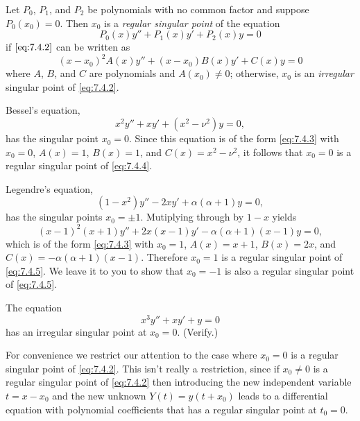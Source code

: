 \documentclass{ximera}
\begin{document}
\begin{definition}\label{thmtype:7.4.1}
Let $P_0$, $P_1$, and $P_2$ be polynomials with no common factor and
suppose  $P_0(x_0)=0$. Then $x_0$ is a \textit{regular singular
point} of the equation
\begin{equation} \label{eq:7.4.2}
P_0(x)y''+P_1(x)y'+P_2(x)y=0
\end{equation}
if $\eqref{eq:7.4.2}$ can be written as
\begin{equation} \label{eq:7.4.3}
(x-x_0)^2A(x)y''+(x-x_0)B(x)y'+C(x)y=0
\end{equation}
where $A$, $B$, and $C$ are polynomials and $A(x_0)\neq0$;   otherwise,
$x_0$ is an \textit{irregular} singular point of \eqref{eq:7.4.2}.
\end{definition}

\begin{example}\label{example:7.4.1}
Bessel's equation,
\begin{equation} \label{eq:7.4.4}
x^2y''+xy'+(x^2-\nu^2)y=0,
\end{equation}
has the singular point $x_0=0$. Since this equation is of the form
\eqref{eq:7.4.3} with $x_0=0$, $A(x)=1$, $B(x)=1$, and $C(x)=x^2-\nu^2$,
it follows that $x_0=0$ is a regular singular point of
\eqref{eq:7.4.4}.
 \end{example}

\begin{example}\label{example:7.4.2}
Legendre's equation,
\begin{equation} \label{eq:7.4.5}
(1-x^2)y''-2xy'+\alpha(\alpha+1)y=0,
\end{equation}
has the singular points $x_0=\pm1$. Mutiplying through by $1-x$
yields
$$
(x-1)^2(x+1)y''+2x(x-1)y'-\alpha(\alpha+1)(x-1)y=0,
$$
which is of the form \eqref{eq:7.4.3} with $x_0=1$, $A(x)=x+1$,
$B(x)=2x$, and $C(x)=-\alpha(\alpha+1)(x-1)$. Therefore $x_0=1$
is a regular singular point of \eqref{eq:7.4.5}. We leave it to
you to show that $x_0=-1$ is also a regular singular point of
\eqref{eq:7.4.5}.
\end{example}

\begin{example}\label{example:7.4.3}
The equation
$$
x^3y''+xy'+y=0
$$
has an irregular  singular point at $x_0=0$. (Verify.)
\end{example}

For convenience we restrict our attention to the case where $x_0=0$ is
a regular singular point of \eqref{eq:7.4.2}. This isn't  really a
restriction, since if $x_0\neq0$ is a regular singular point of
\eqref{eq:7.4.2} then  introducing the new independent variable $t=x-x_0$
and the new unknown $Y(t)=y(t+x_0)$ leads to a differential equation
with polynomial coefficients that has a regular singular point at
$t_0=0$. 
\end{document}
